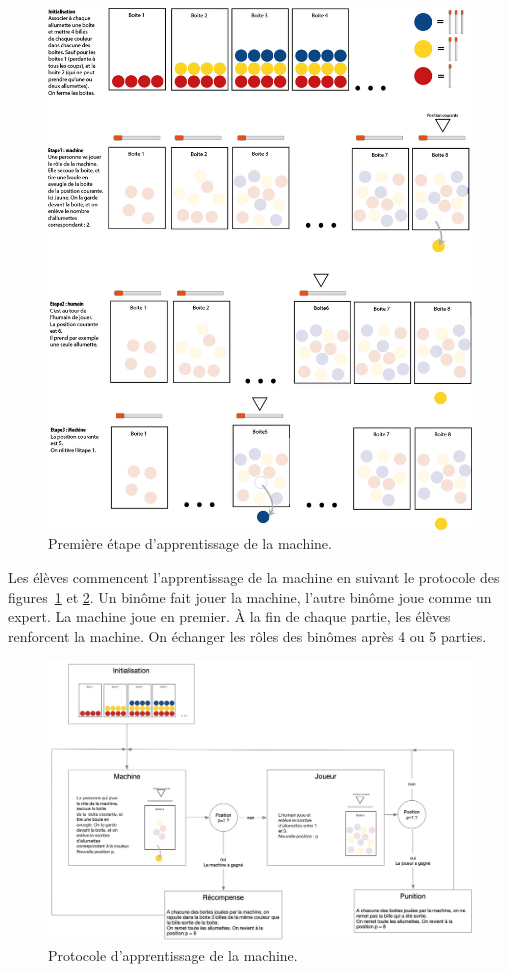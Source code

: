 \documentclass[a4paper,12pt]{article}
\begin{document}
\begin{figure}[h!]
\centering
\includegraphics[scale = 0.7]{./Images/fig3-v2.jpg}
\caption{Première étape d'apprentissage de la machine.}
\label{fig:PremApprentissage}
\end{figure}

Les élèves commencent l'apprentissage de la machine en suivant le protocole des figures~\ref{fig:PremApprentissage} et \ref{fig:ProtocoleApprentissage}. 
Un binôme fait jouer la machine, l'autre binôme joue comme un expert. La machine joue en premier. À la fin de chaque partie, les élèves renforcent la machine. 
On échanger les rôles des binômes après  4 ou 5 parties.

\begin{figure}[h!]
\centering
\includegraphics[scale = 0.9]{./Images/fig1-v3.jpg}
\caption{Protocole d'apprentissage de la machine.}
\label{fig:ProtocoleApprentissage}
\end{figure}
\end{document}
